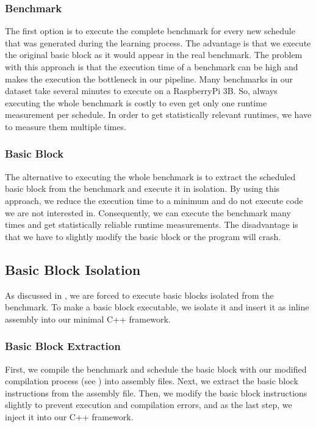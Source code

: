 \subsubsection{Benchmark}
The first option is to execute the complete benchmark for every new schedule that was generated during the learning process.
The advantage is that we execute the original basic block as it would appear in the real benchmark.
The problem with this approach is that the execution time of a benchmark can be high and makes the execution the bottleneck in our pipeline.
Many benchmarks in our dataset take several minutes to execute on a RaspberryPi 3B.
So, always executing the whole benchmark is costly to even get only one runtime measurement per schedule.
In order to get statistically relevant runtimes, we have to measure them multiple times.

\subsubsection{Basic Block}
The alternative to executing the whole benchmark is to extract the scheduled basic block from the benchmark and execute it in isolation.
By using this approach, we reduce the execution time to a minimum and do not execute code we are not interested in.
Consequently, we can execute the benchmark many times and get statistically reliable runtime measurements.
The disadvantage is that we have to slightly modify the basic block or the program will crash.

\subsection{Basic Block Isolation}
\label{sec:approach:bbisolation}
As discussed in , we are forced to execute basic blocks isolated from the benchmark.
To make a basic block executable, we isolate it and insert it as inline assembly into our minimal C++ framework.

\subsubsection{Basic Block Extraction}
First, we compile the benchmark and schedule the basic block with our modified compilation process (see ) into assembly files.
Next, we extract the basic block instructions from the assembly file.
Then, we modify the basic block instructions slightly to prevent execution and compilation errors, and as the last step, we inject it into our C++ framework.

